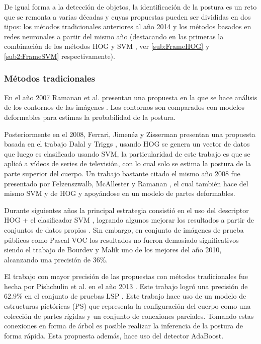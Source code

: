         De igual forma a la detección de objetos, la identificación de la postura es un reto que se remonta a varias décadas y cuyas propuestas pueden ser divididas en dos tipos: los métodos tradicionales anteriores al año 2014 y los métodos basados en redes neuronales a partir del mismo año (destacando en las primeras la combinación de los métodos HOG y SVM \cite{Aslan2020CnnVsHogSVM}, ver \ref{sub:FrameHOG} y \ref{sub2:FrameSVM} respectivamente).
        
        \subsubsection{Métodos tradicionales}
        \label{Sub2:FramePoseEstimationTraditional}

        En el año 2007 Ramanan et al. presentan una propuesta en la que se hace análisis de los contornos de las imágenes \cite{Ramanan2007}. Los contornos son comparados con modelos deformables para estimas la probabilidad de la postura. 
        
        Posteriormente en el 2008, Ferrari, Jimenéz y Zisserman presentan una propuesta \cite{Ferrari2008} basada en el trabajo  Dalal y Triggs \cite{Dalal2005}, usando HOG se genera un vector de datos que luego es clasificado usando SVM, la particularidad de este trabajo es que se aplicó a vídeos de series de televisión, con lo cual solo se estima la postura de la parte superior del cuerpo. Un trabajo bastante citado el mismo año 2008 fue presentado por Felzenszwalb, McAllester y Ramanan \cite{Felzenszwalb2008}, el cual también hace del mismo SVM y de HOG y apoyándose en un modelo de partes deformables.

        Durante siguientes años la principal estrategia consistió en el uso del  descriptor HOG + el clasificador SVM \cite{Bourdev2010, Johnson2011, Ladicky2013}, logrando algunos mejorar los resultados a partir de conjuntos de datos propios \cite{Bourdev2010, Johnson2011, FLIC2013}. Sin embargo, en conjunto de imágenes de prueba públicos como Pascal VOC \cite{VOC2010} los resultados no fueron demasiado significativos siendo el trabajo de Bourdev y Malik \cite{Bourdev2010} uno de los mejores del año 2010, alcanzando una precisión de 36\%.

        El trabajo con mayor precisión de las propuestas con métodos tradicionales fue hecha por Pishchulin et al. en el año 2013 \cite{Pishchulin2013}. Este trabajo logró una precisión de 62.9\% en el conjunto de pruebas LSP \cite{LSP2010}. Este trabajo hace uso de un modelo de estructuras pictóricas (PS) que representa la configuración del cuerpo como una colección de partes rígidas y un conjunto de conexiones parciales. Tomando estas conexiones en forma de árbol es posible realizar la inferencia de la postura de forma rápida. Esta propuesta además, hace uso del detector AdaBoost.
        
